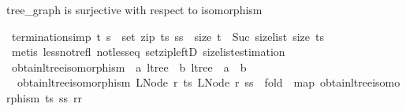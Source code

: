 \begin{isabellebody}
\endisatagproof
{\isafoldproof}%
%
\isadelimproof
%
\endisadelimproof
%
\begin{isamarkuptext}%
tree_graph is surjective with respect to isomorphism%
\end{isamarkuptext}\isamarkuptrue%
\isamarkupfalse%
\ {\isacharbrackleft}{\kern0pt}termination{\isacharunderscore}{\kern0pt}simp{\isacharbrackright}{\kern0pt}{\isacharcolon}{\kern0pt}\ {\isachardoublequoteopen}{\isacharparenleft}{\kern0pt}t{\isacharcomma}{\kern0pt}\ s{\isacharparenright}{\kern0pt}\ {\isasymin}\ set\ {\isacharparenleft}{\kern0pt}zip\ ts\ ss{\isacharparenright}{\kern0pt}\ {\isasymLongrightarrow}\ size\ t\ {\isacharless}{\kern0pt}\ Suc\ {\isacharparenleft}{\kern0pt}size{\isacharunderscore}{\kern0pt}list\ size\ ts{\isacharparenright}{\kern0pt}{\isachardoublequoteclose}\isanewline
%
\isadelimproof
\ \ %
\endisadelimproof
%
\isatagproof
{}\isamarkupfalse%
\ {\isacharparenleft}{\kern0pt}metis\ less{\isacharunderscore}{\kern0pt}not{\isacharunderscore}{\kern0pt}refl\ not{\isacharunderscore}{\kern0pt}less{\isacharunderscore}{\kern0pt}eq\ set{\isacharunderscore}{\kern0pt}zip{\isacharunderscore}{\kern0pt}leftD\ size{\isacharunderscore}{\kern0pt}list{\isacharunderscore}{\kern0pt}estimation{\isacharparenright}{\kern0pt}%
\endisatagproof
{\isafoldproof}%
%
\isadelimproof
\isanewline
%
\endisadelimproof
\isanewline
{}\isamarkupfalse%
\ obtain{\isacharunderscore}{\kern0pt}ltree{\isacharunderscore}{\kern0pt}isomorphism\ {\isacharcolon}{\kern0pt}{\isacharcolon}{\kern0pt}\ {\isachardoublequoteopen}{\isacharprime}{\kern0pt}a\ ltree\ {\isasymRightarrow}\ {\isacharprime}{\kern0pt}b\ ltree\ {\isasymRightarrow}\ {\isacharparenleft}{\kern0pt}{\isacharprime}{\kern0pt}a\ {\isasymrightharpoonup}\ {\isacharprime}{\kern0pt}b{\isacharparenright}{\kern0pt}{\isachardoublequoteclose}\ \isanewline
\ \ {\isachardoublequoteopen}obtain{\isacharunderscore}{\kern0pt}ltree{\isacharunderscore}{\kern0pt}isomorphism\ {\isacharparenleft}{\kern0pt}LNode\ r{}\ ts{\isacharparenright}{\kern0pt}\ {\isacharparenleft}{\kern0pt}LNode\ r{}\ ss{\isacharparenright}{\kern0pt}\ {\isacharequal}{\kern0pt}\ fold\ {\isacharparenleft}{\kern0pt}{\isacharplus}{\kern0pt}{\isacharplus}{\kern0pt}{\isacharparenright}{\kern0pt}\ {\isacharparenleft}{\kern0pt}map{}\ obtain{\isacharunderscore}{\kern0pt}ltree{\isacharunderscore}{\kern0pt}isomorphism\ ts\ ss{\isacharparenright}{\kern0pt}\ {\isacharbrackleft}{\kern0pt}r{}{\isasymmapsto}r{}{\isacharbrackright}{\kern0pt}{\isachardoublequoteclose}\isanewline

\end{isabellebody}
